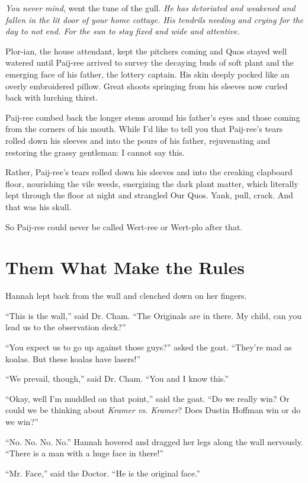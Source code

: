 \documentclass[10pt,twoside]{report}
\begin{document}
{\em You never mind}, went the tune of the gull.  {\em He has
  detoriated and weakened and fallen in the lit door of your home
  cottage.  His tendrils needing and crying for the day to not
  end. For the sun to stay fixed and wide and attentive.}

Plor-ian, the house attendant, kept the pitchers coming and Quos
stayed well watered until Paij-ree arrived to survey the decaying buds
of soft plant and the emerging face of his father, the lottery
captain.  His skin deeply pocked like an overly embroidered
pillow. Great shoots springing from his sleeves now curled back with
lurching thirst.

Paij-ree combed back the longer stems around his father's eyes and
those coming from the corners of his mouth.  While I'd like to tell
you that Paij-ree's tears rolled down his sleeves and into the pours
of his father, rejuvenating and restoring the grassy gentleman: I
cannot say this.

Rather, Paij-ree's tears rolled down his sleeves and into the creaking
clapboard floor, nourishing the vile weeds, energizing the dark plant
matter, which literally lept through the floor at night and strangled
Our Quos.  Yank, pull, crack.  And that was his skull.

So Paij-ree could never be called Wert-ree or Wert-plo after that.


\section{Them What Make the Rules}


Hannah lept back from the wall and clenched down on her fingers.

``This is the wall,'' said Dr. Cham.  ``The Originals are in there.
My child, can you lead us to the observation deck?''

``You expect us to go up against those guys?'' asked the goat.
``They're mad as koalas.  But these koalas have lasers!''

``We prevail, though,'' said Dr. Cham.  ``You and I know this.''

``Okay, well I'm muddled on that point,'' said the goat.  ``Do we
really win? Or could we be thinking about {\em Kramer vs. Kramer}?
Does Dustin Hoffman win or do we win?''

``No.  No.  No.  No.''  Hannah hovered and dragged her legs along the
wall nervously. ``There is a man with a huge face in there!''

``Mr. Face,'' said the Doctor.  ``He is the original face.''
\end{document}
